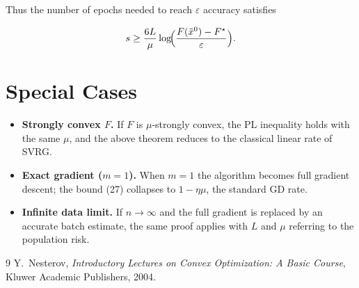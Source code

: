 \documentclass{article}
\begin{document}
Thus the number of epochs needed to reach $\varepsilon$ accuracy satisfies  

\[
s\ge \frac{6L}{\mu}\log\!\Bigl(\frac{F(\tilde{x}^{0})-F^{\star}}{\varepsilon}\Bigr).
\]

\section*{Special Cases}
\begin{itemize}
\item \textbf{Strongly convex $F$.} If $F$ is $\mu$‑strongly convex, the PL inequality holds with the same $\mu$, and the above theorem reduces to the classical linear rate of SVRG.
\item \textbf{Exact gradient ($m=1$).} When $m=1$ the algorithm becomes full gradient descent; the bound (27) collapses to $1-\eta\mu$, the standard GD rate.
\item \textbf{Infinite data limit.} If $n\to\infty$ and the full gradient is replaced by an accurate batch estimate, the same proof applies with $L$ and $\mu$ referring to the population risk.
\end{itemize}

\begin{thebibliography}{9}
Y.~Nesterov, \emph{Introductory Lectures on Convex Optimization: A Basic Course}, Kluwer Academic Publishers, 2004.
\end{thebibliography}
\end{document}
